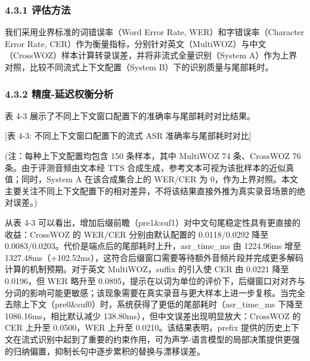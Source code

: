 \documentclass[UTF8,a4paper,12pt]{ctexart}
\begin{document}
\subsubsection*{4.3.1 评估方法}


我们采用业界标准的词错误率（Word Error Rate, WER）和字错误率（Character Error Rate, CER）作为衡量指标，分别针对英文（MultiWOZ）与中文（CrossWOZ）样本计算转录误差，并将非流式全量识别（System A）作为上界对照，比较不同流式上下文配置（System B）下的识别质量与尾部耗时。  

\subsubsection*{4.3.2 精度-延迟权衡分析}


表 4-3 展示了不同上下文窗口配置下的准确率与尾部耗时对比结果。

\begin{table}[H]
\centering
\setlength{\tabcolsep}{4pt}
\renewcommand{\arraystretch}{1.2}
\scriptsize
{}
\end{table}


[表 4-3: 不同上下文窗口配置下的流式 ASR 准确率与尾部耗时对比]

(注：每种上下文配置均包含 150 条样本，其中 MultiWOZ 74 条、CrossWOZ 76 条。由于评测音频由文本经 TTS 合成生成，参考文本可视为该批样本的近似真值；同时，System A 在该合成集合上的 WER/CER 为 0，作为上界对照。本文主要关注不同上下文配置下的相对差异，不将该结果直接外推为真实录音场景的绝对误差。)  

从表 4-3 可以看出，增加后缀前瞻（pre1\&suf1）对中文句尾稳定性具有更直接的收益：CrossWOZ 的 WER/CER 分别由默认配置的 0.0118/0.0292 降至 0.0083/0.0203。代价是端点后的尾部耗时上升，asr\_time\_ms 由 1224.96ms 增至 1327.48ms（+102.52ms），这符合后缀窗口需要等待额外音频片段并完成更多解码计算的机制预期。对于英文 MultiWOZ，suffix 的引入使 CER 由 0.0221 降至 0.0196，但 WER 略升至 0.0895，提示在以词为单位的评价下，后缀窗口对对齐与分词的影响可能更敏感；该现象需要在真实录音与更大样本上进一步复核。当完全去除上下文（pre0\&suf0）时，系统获得了更低的尾部耗时（asr\_time\_ms 下降至 1086.16ms，相比默认减少 138.80ms），但中文误差出现明显放大：CrossWOZ 的 CER 上升至 0.0500，WER 上升至 0.0210。该结果表明，prefix 提供的历史上下文在流式识别中起到了重要的约束作用，可为声学-语言模型的局部决策提供更强的归纳偏置，抑制长句中逐步累积的替换与漂移误差。  
\end{document}
